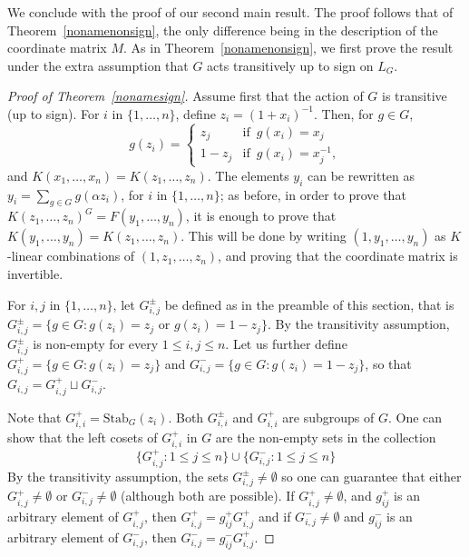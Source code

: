 \documentclass[12pt]{article}
\theoremstyle{plain}
\begin{document}
We conclude with the proof of our second main result.  The proof
follows that of Theorem~\ref{nonamenonsign}, the only difference being in
the description of the coordinate matrix $M$.  As in
Theorem~\ref{nonamenonsign}, we first prove the result under the extra
assumption that $G$ acts transitively up to sign on $L_G$.

\begin{proof}[Proof of Theorem~\ref{nonamesign}]
  Assume first that the action of $G$ is transitive (up to sign).
  For $i$ in $\{1,\dots,n\}$, define $z_i = (1+x_i)^{-1} $. Then, for $g
  \in G$, $$g(z_i) = \begin{cases} z_j & \text{if} \,\,\, g(x_i) = x_j
    \\ 1-z_j & \text{if} \,\,\, g(x_i) = x_j^{-1},
  \end{cases}$$ 
  and $K(x_1, \ldots , x_n) = K(z_1, \ldots, z_n).$ The elements $y_i$
  can be rewritten as $y_i = \sum_{g \in G} g ({\alpha}z_i)$, for $i$
  in $\{1, \ldots, n\}$; as before, in order to prove that
  $K(z_1,\ldots, z_n)^G = F(y_1, \ldots, y_{n})$, it is enough to
  prove that $K(y_1,\dots,y_n)=K(z_1,\dots,z_n)$. This will be done by
  writing $(1,y_1,\dots,y_n)$ as $K$-linear combinations of
  $(1,z_1,\dots,z_n)$, and proving that the coordinate matrix is
  invertible.

  For $i,j$ in $\lbrace 1, \ldots , n \rbrace$, let $G^{\pm}_{i,j}$
  be defined as in the preamble of this section, that is 
  $G^{\pm}_{i,j}=\lbrace g \in G : g(z_i) = z_j \,\, \text{or} \,\, g(z_i) = 1-z_j
  \rbrace $. By the transitivity assumption, $G^{\pm}_{i,j}$ is
  non-empty for every $1 \leq i,j \leq n$. Let us further define $G^{+}_{i,j}
  = \lbrace g \in G : g(z_i) = z_j \rbrace$ and $G^{-}_{i,j} =
  \lbrace g \in G : g(z_i) = 1- z_j \rbrace$, so that $G_{i,j}=
  G^{+}_{i,j}\sqcup G^{-}_{i,j}$.  

Note that $G^+_{i,i}=\textrm{Stab}_G(z_i)$.  Both $G^{\pm}_{i,i}$ and $G^+_{i,i}$ are subgroups of $G$.  One can show that the left cosets of $G^+_{i,i}$ in $G$ are the non-empty sets in the collection
$$\{G^+_{i,j}:1\le j\le n\} \cup \{G^-_{i,j}: 1\le j\le n\}$$
By the transitivity assumption, the sets $G^{\pm}_{i,j}\ne \emptyset$
so one can guarantee that either $G^+_{i,j}\ne \emptyset$ or $G^-_{i,j}\ne \emptyset$ (although both are possible).  If $G^+_{i,j}\ne \emptyset$, and $g_{ij}^+$ is an arbitrary element of $G^+_{i,j}$, then 
$G^+_{i,j}=g_{ij}^+G^+_{i,j}$ and if $G^-_{i,j}\ne \emptyset$ and $g_{ij}^-$ is an arbitrary element of $G^-_{i,j}$, then 
$G^-_{i,j}=g_{ij}^-G^+_{i,j}$.
  

\end{proof}
\end{document}
